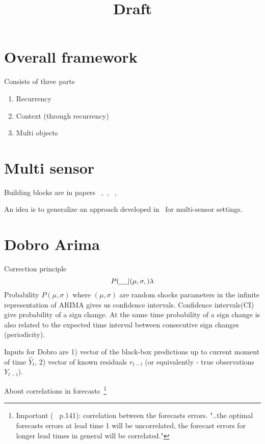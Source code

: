 \documentclass[paper=a4, fontsize=12pt]{article}
\title{Draft}
\begin{document}
\maketitle
\section{Overall framework}
Consists of three parts
\begin{enumerate}
	\item Recurrency
	\item Context (through recurrency)
	\item Multi objects
\end{enumerate}

\section{Multi sensor}
Building blocks are in papers ~\cite{MacKay2007},~\cite{Chapados2014},~\cite{Rasmussen2010} ,~\cite{MacKay_Inference_Book}

An idea is to generalize an approach developed in~\cite{MacKay2007} for multi-sensor settings.


\section{Dobro Arima}

Correction principle 
\begin{equation}
P(\underline{\hspace{12px}} | (\mu, \sigma,) \lambda
\end{equation}
Probability $P(\mu,\sigma)$ where $(\mu,\sigma)$ are random shocks parameters in the infinite representation of ARIMA gives us confidence intervals.
Confidence intervals(CI) give probability of a sign change.
At the same time probability of a sign change is also related to the expected time interval between consecutive sign changes (periodicity).

Inputs for Dobro are 1) vector of the black-box predictions up to current moment of time $\hat Y_t$, 2) vector of known residuals $r_{t-l}$ (or equivalently - true observations $Y_{t-l}$).

About correlations in forecasts~\footnote{Important (~\cite{Box_Jenkins_Arima} p.141): correlation between the forecasts errors. "..the optimal forecasts errors at lead time 1 will be uncorrelated, the forecast errors for longer lead times in general will be correlated."}
\end{document}
